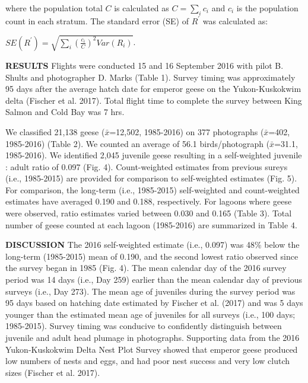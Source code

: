 \documentclass[]{article}
\begin{document}
\medskip
where the population total \(C\) is calculated as \(C = \sum_i {c_i}\)
and \({c_i}\) is the population count in each stratum. The standard
error (SE) of \(R^\prime\) was calculated as: \medskip

\begin{center}
$SE(R^\prime) = \sqrt {\sum_i  \left( \frac{c_i}{C} \right)^2 Var(R_i)}$.  
\end{center}

\smallskip

\setlength{\parskip}{4ex} \textbf{RESULTS}\newline
Flights were conducted 15 and 16 September 2016 with pilot B. Shults and
photographer D. Marks (Table 1). Survey timing was approximately 95 days
after the average hatch date for emperor geese on the Yukon-Kuskokwim
delta (Fischer et al. 2017). Total flight time to complete the survey
between King Salmon and Cold Bay was 7 hrs.

We classified 21,138 geese (\(\bar{x}\)=12,502, 1985-2016) on 377
photographs (\(\bar{x}\)=402, 1985-2016) (Table 2). We counted an
average of 56.1 birds/photograph (\(\bar{x}\)=31.1, 1985-2016). We
identified 2,045 juvenile geese resulting in a self-weighted juvenile :
adult ratio of 0.097 (Fig. 4). Count-weighted estimates from previous
sureys (i.e., 1985-2015) are provided for comparison to self-weighted
estimates (Fig. 5). For comparison, the long-term (i.e., 1985-2015)
self-weighted and count-weighted estimates have averaged 0.190 and 0.188,
respectively. For lagoons where geese were observed, ratio estimates
varied between 0.030 and 0.165 (Table 3). Total number of geese counted
at each lagoon (1985-2016) are summarized in Table 4.

\textbf{DISCUSSION}\newline
The 2016 self-weighted estimate (i.e., 0.097) was 48\% below the
long-term (1985-2015) mean of 0.190, and the second lowest ratio observed
since the survey began in 1985 (Fig. 4). The mean calendar day of the
2016 survey period was 14 days (i.e., Day 259) earlier than the mean
calendar day of previous surveys (i.e., Day 273). The mean age of
juveniles during the survey period was 95 days based on hatching date
estimated by Fischer et al. (2017) and was 5 days younger than the
estimated mean age of juveniles for all surveys (i.e., 100 days;
1985-2015). Survey timing was conducive to confidently distinguish
between juvenile and adult head plumage in photographs. Supporting data
from the 2016 Yukon-Kuskokwim Delta Nest Plot Survey showed that emperor
geese produced low numbers of nests and eggs, and had poor nest success
and very low clutch sizes (Fischer et al. 2017).
\end{document}
